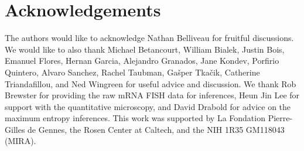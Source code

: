 \section*{Acknowledgements}

The authors would like to acknowledge Nathan Belliveau for fruitful
discussions. We would like to also thank Michael Betancourt, William Bialek,
Justin Bois, Emanuel Flores, Hernan Garcia, Alejandro Granados, Jane Kondev,
Porfirio Quintero, Alvaro Sanchez, Rachel Taubman, Gašper Tkačik, Catherine
Triandafillou, and Ned Wingreen for useful advice and discussion. We thank Rob
Brewster for providing the raw mRNA FISH data for inferences, Heun Jin Lee for
support with the quantitative microscopy, and David Drabold for advice on the
maximum entropy inferences. This work was supported by La Fondation
Pierre-Gilles de Gennes, the Rosen Center at Caltech, and the NIH 1R35 GM118043
(MIRA).
